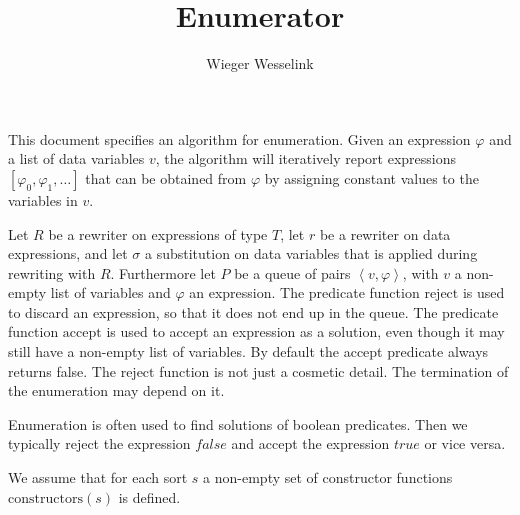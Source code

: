 \documentclass{article}
\begin{document}
\title{Enumerator}
\author{Wieger Wesselink}
\maketitle

This document specifies an algorithm for enumeration. Given an expression $\varphi$ and
a list of data variables $v$, the algorithm will iteratively report expressions
$[\varphi_0, \varphi_1, \ldots]$ that can be obtained from $\varphi$ by assigning
constant values to the variables in $v$.

Let $R$ be a rewriter on expressions of type $T$, let $r$ be a rewriter on
data expressions, and let $\sigma $ a substitution on data variables that is
applied during rewriting with $R$. Furthermore let $P$ be a queue of pairs
$\left\langle v,\varphi \right\rangle$, with $v$ a non-empty list of variables and
$\varphi$ an expression. The predicate function $\mathrm{reject}$ is used to discard
an expression, so that it does not end up in the queue. The predicate function $\mathrm{accept}$ is used to accept an expression as a solution, even though it
may still have a non-empty list of variables. By default the accept predicate
always returns false. The $\mathrm{reject}$ function is not just a cosmetic detail. The termination of the enumeration may depend on it.

Enumeration is often used to find solutions of boolean predicates. Then we typically reject the expression $false$ and accept the expression $true$ or vice versa.

We assume that for each sort $s$ a non-empty set of
constructor functions $\mathrm{constructors}(s)$ is defined.
\end{document}
